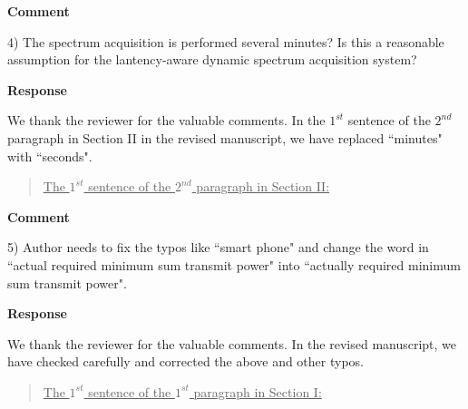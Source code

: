 \documentclass[12pt,draftcls, onecolumn]{IEEEtran}
\begin{document}
\vspace{3mm}
\noindent\textcolor[rgb]{1.00,0.00,0.00}{\textbf{Comment}}
\vspace{3mm}

4) The spectrum acquisition is performed several minutes? Is this a reasonable assumption for the lantency-aware dynamic spectrum acquisition system?

\vspace{3mm} \noindent\textcolor[rgb]{0.00,0.00,1.00}{\textbf{Response}}
\vspace{2mm}

We thank the reviewer for the valuable comments. In the $1^{st}$ sentence of the $2^{nd}$ paragraph in Section II in the revised manuscript, we have replaced ``minutes" with ``seconds".

\begin{quote}
\underline{The $1^{st}$ sentence of the $2^{nd}$ paragraph in Section II:}
\vspace{0mm}
\end{quote}

\vspace{3mm}
\noindent\textcolor[rgb]{1.00,0.00,0.00}{\textbf{Comment}}
\vspace{3mm}

5) Author needs to fix the typos like ``smart phone" and change the word in ``actual required minimum sum transmit power" into ``actually required minimum sum transmit power".


\vspace{3mm} \noindent\textcolor[rgb]{0.00,0.00,1.00}{\textbf{Response}}
\vspace{2mm}

We thank the reviewer for the valuable comments. In the revised manuscript, we have checked carefully and corrected the above and other typos.

\begin{quote}
\underline{The $1^{st}$ sentence of the $1^{st}$ paragraph in Section I:}
\vspace{0mm}
\end{quote}
\end{document}
